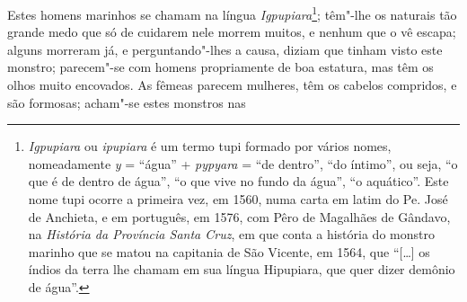 Estes homens marinhos se chamam na língua \textit{Igpupiara}\footnote{ \textit{Igpupiara} 
ou \textit{ipupiara} é um termo tupi
formado por vários nomes, nomeadamente \textit{y} = ``água'' +
\textit{pypyara} = ``de dentro'', ``do íntimo'', ou seja, ``o que é de
dentro de água'', ``o que vive no fundo da água'', ``o aquático''. Este
nome tupi ocorre a primeira vez, em 1560, numa carta em latim do Pe.
José de Anchieta, e em português, em 1576, com Pêro de Magalhães de Gândavo,
na \textit{História da Província Santa Cruz}, em que conta a
história do monstro marinho que se matou na capitania de São Vicente,
em 1564, que ``[\ldots{}] os índios da terra lhe chamam em sua língua
Hipupiara, que quer dizer demônio de água''.}; têm"-lhe os naturais tão
grande medo que só de cuidarem nele morrem muitos, e nenhum que o vê
escapa; alguns morreram já, e perguntando"-lhes a causa, diziam que
tinham visto este monstro; parecem"-se com homens propriamente de boa
estatura, mas têm os olhos muito encovados. As fêmeas parecem mulheres,
têm os cabelos compridos, e são formosas; acham"-se estes monstros nas
